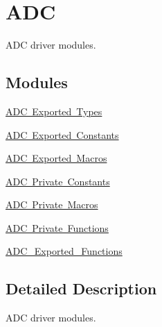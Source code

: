 \hypertarget{group___a_d_c}{}\section{A\+DC}
\label{group___a_d_c}


A\+DC driver modules.  


\subsection*{Modules}
\begin{DoxyCompactItemize}
\item 
\mbox{\hyperlink{group___a_d_c___exported___types}{A\+D\+C Exported Types}}
\item 
\mbox{\hyperlink{group___a_d_c___exported___constants}{A\+D\+C Exported Constants}}
\item 
\mbox{\hyperlink{group___a_d_c___exported___macros}{A\+D\+C Exported Macros}}
\item 
\mbox{\hyperlink{group___a_d_c___private___constants}{A\+D\+C Private Constants}}
\item 
\mbox{\hyperlink{group___a_d_c___private___macros}{A\+D\+C Private Macros}}
\item 
\mbox{\hyperlink{group___a_d_c___private___functions}{A\+D\+C Private Functions}}
\item 
\mbox{\hyperlink{group___a_d_c___exported___functions}{A\+D\+C\+\_\+\+Exported\+\_\+\+Functions}}
\end{DoxyCompactItemize}


\subsection{Detailed Description}
A\+DC driver modules. 


